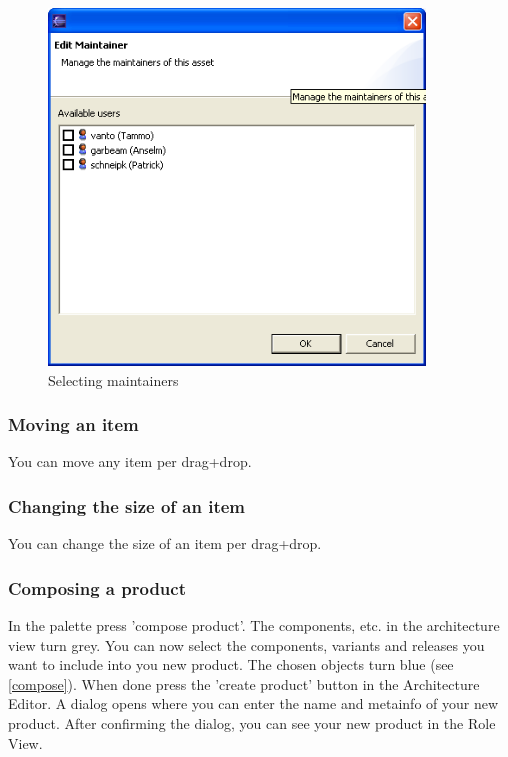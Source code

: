 \begin{figure}[h!]
\begin{center}
\includegraphics[width=10cm]{maintainer.png}
   \caption{Selecting maintainers}
\label{maintainer}
\end{center}
\end{figure}\par


\subsubsection{Moving an item}
You can move any item per drag+drop.

\subsubsection{Changing the size of an item}
You can change the size of an item per drag+drop.


\subsubsection{Composing a product}

In the palette press 'compose product'. The components, etc. in the architecture view turn
grey. You can now select the components, variants and releases you want to include into
you new product. The chosen objects turn blue (see \ref{compose}). When done press the 
'create product' button in the Architecture Editor. A dialog opens where you can enter
the name and metainfo of your new product. After confirming the dialog, you can see
your new product in the Role View.

